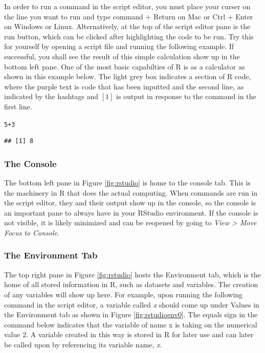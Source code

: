 \documentclass{report}\usepackage[]{graphicx}\usepackage[]{color}
\makeatletter
\newcommand{\hlnum}[1]{\textcolor[rgb]{0.686,0.059,0.569}{#1}}%
\newcommand{\hlopt}[1]{\textcolor[rgb]{0,0,0}{#1}}%
\newenvironment{kframe}{%
 \def\at@end@of@kframe{}%
 \ifinner\ifhmode%
  \def\at@end@of@kframe{\end{minipage}}%
  \begin{minipage}{\columnwidth}%
 \fi\fi%
 \def\FrameCommand##1{\hskip\@totalleftmargin \hskip-\fboxsep
 \colorbox{shadecolor}{##1}\hskip-\fboxsep
     \hskip-\linewidth \hskip-\@totalleftmargin \hskip\columnwidth}%
 \MakeFramed {\advance\hsize-\width
   \@totalleftmargin\z@ \linewidth\hsize
   \@setminipage}}%
 {\par\unskip\endMakeFramed%
 \at@end@of@kframe}
\newenvironment{knitrout}{}{} %
\makeatother
\begin{document}
In order to run a command in the script editor, you must place your curser on the line you want to run and type \textsf{command + Return} on Mac or \textsf{Ctrl + Enter} on Windows or Linux.  Alternatively, at the top of the script editor pane is the run button, which can be clicked after highlighting the code to be run.  Try this for yourself by opening a script file and running the following example.  If successful, you shall see the result of this simple calculation show up in the bottom left pane.  One of the most basic capabilties of \textsf{R} is as a calculator as shown in this example below.  The light grey box indicates a section of \textsf{R} code, where the purple text is code that has been inputted and the second line, as indicated by the hashtags and $[1]$ is output in response to the command in the first line.  

\begin{knitrout}
\color{fgcolor}\begin{kframe}
\begin{alltt}
\hlnum{5}\hlopt{+}\hlnum{3}
\end{alltt}
\begin{verbatim}
## [1] 8
\end{verbatim}
\end{kframe}
\end{knitrout}


\subsubsection{The Console} 
The bottom left pane in Figure \ref{fig:rstudio} is home to the console tab.  This is the machinery in \textsf{R} that does the actual computing.  When commands are run in the script editor, they and their output show up in the console, so the console is an important pane to always have in your \textsf{RStudio environment}.  If the console is not visible, it is likely minimized and can be reopened by going to \textit{View > Move Focus to Console}. 

\subsubsection{The Environment Tab} 
The top right pane in Figure \ref{fig:rstudio} hosts the \textsf{Environment} tab, which is the home of all stored information in \textsf{R}, such as datasets and variables.  The creation of any variables will show up here.  For example, upon running the following command in the script editor, a variable called \textit{x} should come up under \textsf{Values} in the \textsf{Environment} tab as shown in Figure \ref{fig:rstudioenv0}. The equals sign in the command below indicates that the variable of name \textsf{x} is taking on the numerical value 2. A variable created in this way is stored in \textsf{R} for later use and can later be called upon by referencing its variable name, \textit{x}.   
\end{document}
